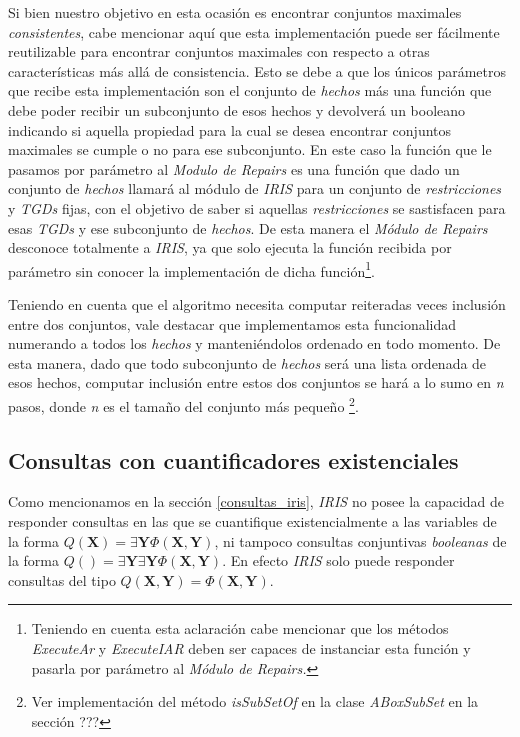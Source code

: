 \documentclass[11pt,a4paper,twoside]{tesis}
\begin{document}
Si bien nuestro objetivo en esta ocasión es encontrar conjuntos maximales \textit{consistentes}, cabe mencionar aquí que esta implementación puede ser fácilmente reutilizable para encontrar conjuntos maximales con respecto a otras características más allá de consistencia. Esto se debe a que los únicos parámetros que recibe esta implementación son el conjunto de \textit{hechos} más una función que debe poder recibir un subconjunto de esos hechos y devolverá un booleano indicando si aquella propiedad para la cual se desea encontrar conjuntos maximales se cumple o no para ese subconjunto. En este caso la función que le pasamos por parámetro al \textit{Modulo de Repairs} es una función que dado un conjunto de \textit{hechos} llamará al módulo de \textit{IRIS} para un conjunto de \textit{restricciones} y \textit{TGDs} fijas, con el objetivo de saber si aquellas \textit{restricciones} se sastisfacen para esas \textit{TGDs} y ese subconjunto de \textit{hechos}. De esta manera el \textit{Módulo de Repairs} desconoce totalmente a \textit{IRIS}, ya que solo ejecuta la función recibida por parámetro sin conocer la implementación de dicha función\footnote{Teniendo en cuenta esta aclaración cabe mencionar que los métodos \textit{ExecuteAr} y \textit{ExecuteIAR} deben ser capaces de instanciar esta función y pasarla por parámetro al \textit{Módulo de Repairs.}}.

Teniendo en cuenta que el algoritmo necesita computar reiteradas veces inclusión entre dos conjuntos, vale destacar que implementamos esta funcionalidad numerando a todos los \textit{hechos} y manteniéndolos ordenado en todo momento. De esta manera, dado que todo subconjunto de \textit{hechos} será una lista ordenada de esos hechos, computar inclusión entre estos dos conjuntos se hará a lo sumo en \textit{n} pasos, donde \textit{n} es el tamaño del conjunto más pequeño \footnote{Ver implementación del método \textit{isSubSetOf} en la clase \textit{ABoxSubSet} en la sección ???}.

\subsection{Consultas con cuantificadores existenciales}

Como mencionamos en la sección \ref{consultas_iris}, \textit{IRIS} no posee la capacidad de responder consultas en las que se cuantifique existencialmente a las variables de la forma $Q(\textbf{X}) = \exists\textbf{Y}\Phi(\textbf{X},\textbf{Y})$, ni tampoco consultas conjuntivas \textit{booleanas} de la forma $Q() = \exists\textbf{Y}\exists\textbf{Y}\Phi(\textbf{X},\textbf{Y})$. En efecto \textit{IRIS} solo puede responder consultas del tipo $Q(\textbf{X},\textbf{Y}) = \Phi(\textbf{X},\textbf{Y})$. 
\end{document}
